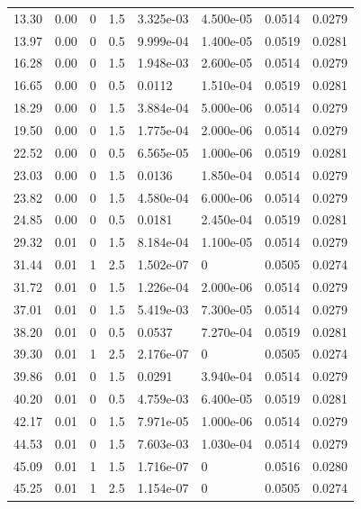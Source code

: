 \documentclass[preview]{standalone}
\begin{document}
{{\begin{tabular}{L{1.2cm}C{1.2cm} C{0.3cm}C{0.5cm} C{1.4cm}C{1.4cm} C{1.4cm}C{1.4cm}}
  13.30  &  0.00  & 0     & 1.5 &  3.325e-03  & 4.500e-05  & 0.0514 &  0.0279   \\ 
  13.97  &  0.00  & 0     & 0.5 &  9.999e-04  & 1.400e-05  & 0.0519 &  0.0281   \\ 
  16.28  &  0.00  & 0     & 1.5 &  1.948e-03  & 2.600e-05  & 0.0514 &  0.0279   \\ 
  16.65  &  0.00  & 0     & 0.5 &  0.0112  & 1.510e-04  & 0.0519 &  0.0281   \\ 
  18.29  &  0.00  & 0     & 1.5 &  3.884e-04  & 5.000e-06  & 0.0514 &  0.0279   \\ 
  19.50  &  0.00  & 0     & 1.5 &  1.775e-04  & 2.000e-06  & 0.0514 &  0.0279   \\ 
  22.52  &  0.00  & 0     & 0.5 &  6.565e-05  & 1.000e-06  & 0.0519 &  0.0281   \\ 
  23.03  &  0.00  & 0     & 1.5 &  0.0136  & 1.850e-04  & 0.0514 &  0.0279   \\ 
  23.82  &  0.00  & 0     & 1.5 &  4.580e-04  & 6.000e-06  & 0.0514 &  0.0279   \\ 
  24.85  &  0.00  & 0     & 0.5 &  0.0181  & 2.450e-04  & 0.0519 &  0.0281   \\ 
  29.32  &  0.01  & 0     & 1.5 &  8.184e-04  & 1.100e-05  & 0.0514 &  0.0279   \\ 
  31.44  &  0.01  & 1     & 2.5 &  1.502e-07  & 0  & 0.0505 &  0.0274   \\ 
  31.72  &  0.01  & 0     & 1.5 &  1.226e-04  & 2.000e-06  & 0.0514 &  0.0279   \\ 
  37.01  &  0.01  & 0     & 1.5 &  5.419e-03  & 7.300e-05  & 0.0514 &  0.0279   \\ 
  38.20  &  0.01  & 0     & 0.5 &  0.0537  & 7.270e-04  & 0.0519 &  0.0281   \\ 
  39.30  &  0.01  & 1     & 2.5 &  2.176e-07  & 0  & 0.0505 &  0.0274   \\ 
  39.86  &  0.01  & 0     & 1.5 &  0.0291  & 3.940e-04  & 0.0514 &  0.0279   \\ 
  40.20  &  0.01  & 0     & 0.5 &  4.759e-03  & 6.400e-05  & 0.0519 &  0.0281   \\ 
  42.17  &  0.01  & 0     & 1.5 &  7.971e-05  & 1.000e-06  & 0.0514 &  0.0279   \\ 
  44.53  &  0.01  & 0     & 1.5 &  7.603e-03  & 1.030e-04  & 0.0514 &  0.0279   \\ 
  45.09  &  0.01  & 1     & 1.5 &  1.716e-07  & 0  & 0.0516 &  0.0280   \\ 
  45.25  &  0.01  & 1     & 2.5 &  1.154e-07  & 0  & 0.0505 &  0.0274   \\ 

\end{tabular}}}
\end{document}
